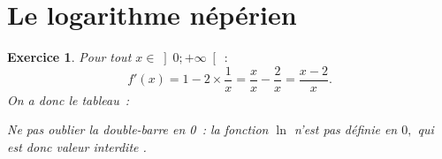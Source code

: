 \documentclass[10pt]{article}
\newtheorem{exo}{Exercice}
\begin{document}
\newpage

\section{Le logarithme népérien}




\begin{exo}

Pour tout $x\in \left]0;+\infty\right[~:$ \[f'(x)=1-2\times \frac{1}{x}=\frac{x}{x}-\frac{2}{x}=\frac{x-2}{x}.\] On a donc le tableau~:

\medskip
\begin{center}
\end{center}

\medskip

\danger Ne pas oublier la double-barre en 0~: la fonction $\ln$ n'est pas définie en $0,$ qui est donc \og valeur interdite \fg.

\end{exo}
\end{document}
